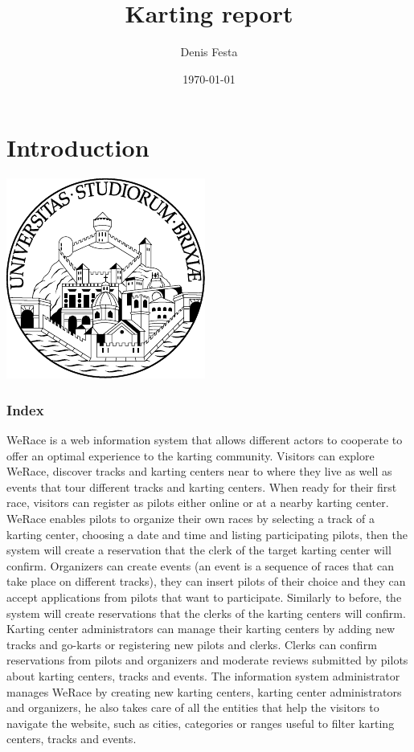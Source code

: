 \documentclass{beamer}
\title{Karting report}
\author{Denis Festa}
\date{\today}
\newcommand{\kc}{WeRace}
\begin{document}
\section*{Introduction}

\begin{frame}
    \titlepage
    \centering
    \includegraphics[width=0.2\linewidth]{unibs-circ-logo.pdf}
\end{frame}


\begin{frame}
    \frametitle{Index}
    \tableofcontents
\end{frame}

\begin{frame}
    \footnotesize
    \kc{} is a web information system that allows different actors to cooperate
    to offer an optimal experience to the karting community.
    Visitors can explore \kc{}, discover tracks and karting centers 
    near to where they live as well as events that tour different tracks and karting centers. When ready
    for their first race, visitors can register as pilots either online or 
    at a nearby karting center. \kc{} enables pilots to organize
    their own races by selecting a track of a karting center, choosing a date 
    and time and listing participating pilots,
    then the system will create a reservation that the clerk of the target karting center
    will confirm. Organizers can create events (an event is a sequence of races that can take
    place on different tracks), they can insert pilots of their choice and they can accept
    applications from pilots that want to participate. Similarly to before, the system 
    will create reservations that the clerks of the karting centers will confirm.
    Karting center administrators can manage their karting centers by adding new
    tracks and go-karts or registering new pilots and clerks.
    Clerks can confirm reservations from pilots and organizers and moderate reviews
    submitted by pilots about karting centers, tracks and events.
    The information system administrator manages \kc{} by creating new karting centers,
    karting center administrators and organizers, he also takes care of all the
    entities that help the visitors to navigate the website, such as cities, categories or ranges 
    useful to filter karting centers, tracks and events.
\end{frame}
\end{document}
